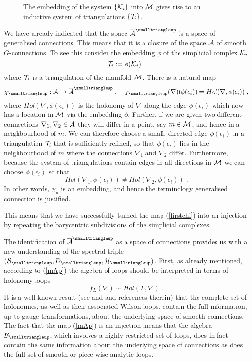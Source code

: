 \documentclass[12pt]{article}
\newcommand{\ba}{\begin{eqnarray}}
\newcommand{\ea}{\end{eqnarray}}
\def\e{\epsilon}
\def\ca{{\cal A}}
\def\cb{{\cal B}}
\def\ch{{\cal H}}
\def\ck{{\cal K}}
\def\cm{{\cal M}}
\def\ct{{\cal T}}
\begin{document}
\begin{figure} [t]
\begin{center}
 
\caption{The embedding of the system $\{\ck_i\}$ into $\cm$ gives rise to an inductive system of triangulations $\{\ct_i\}$.}
\label{JohannesFig}
\end{center}
\end{figure}
We have already indicated that the space $\overline{\ca}^{\smalltriangleup}$ is a space of generalised connections. This means that it is a closure of the space $\ca$ of smooth $G$-connections. To see this consider the embedding $\phi$ of the simplicial complex $\ck_i$
\[
\ct_i :=\phi(\ck_i)\;,
\]
where $\ct_i$ is a triangulation of the manifold $\cm$. There is a natural map 
\ba
\chi_{\smalltriangleup}:\ca\rightarrow\overline{\ca}^{\smalltriangleup}\;,\quad\chi_{\smalltriangleup}(\nabla)(\phi(\e_i))=Hol(\nabla,\phi(\e_i))\;,
\label{mAp}
\ea
where $Hol(\nabla,\phi(\e_i))$ is the holonomy of $\nabla$ along the edge $\phi(\e_i)$ which now has a location in $\cm$ via the embedding $\phi$. Further, if we are given two different connections $\nabla_1,\nabla_2\in\ca$ they will differ in a point, say $m\in\cm$, and hence in a neighbourhood of $m$. We can therefore choose a small, directed edge $\phi(\e_i)$ in a triangulation $\ct_i$ that is sufficiently refined, so that $\phi(\e_i)$ lies in the neighbourhood of $m$ where the connections $\nabla_1$ and $\nabla_2$ differ. Furthermore, because the system of triangulations contain edges in all directions in $\cm$ we can choose $\phi(\e_i)$ so that $$Hol(\nabla_1,\phi(\e_i))\not=Hol(\nabla_2,\phi(\e_i))\;.$$ In other words, $\chi_{\smalltriangleup}$ is an embedding, and hence the terminology generalised connection is justified.

This means that we have successfully turned the map (\ref{firstchi}) into an injection by repeating the barycentric subdivisions of the simplicial complexes. 

The identification of $\overline{\ca}^{\smalltriangleup}$ as a space of connections provides us with a new understanding of the spectral triple $(\cb_{\smalltriangleup},D_{\smalltriangleup},\ch_\smalltriangleup)$. First, as already mentioned, according to (\ref{mAp}) the algebra of loops should be interpreted in terms of holonomy loops
\[
f_L(\nabla)\sim Hol(L,\nabla)\;.
\]
It is a well known result (see \cite{Barrett:1991aj} and \cite{Loll:1993yz} and references therein) that the complete set of holonomies, as well as their associated Wilson loops, contain the full information, up to gauge transformations, about the underlying space of smooth connections. 
The fact that the map (\ref{mAp}) is an injection means that the algebra $\cb_{\smalltriangleup}$, which involves a highly restricted set of loops, does in fact contain the same information about the underlying space of connections as does the full set of smooth or piece-wise analytic loops.
\end{document}
